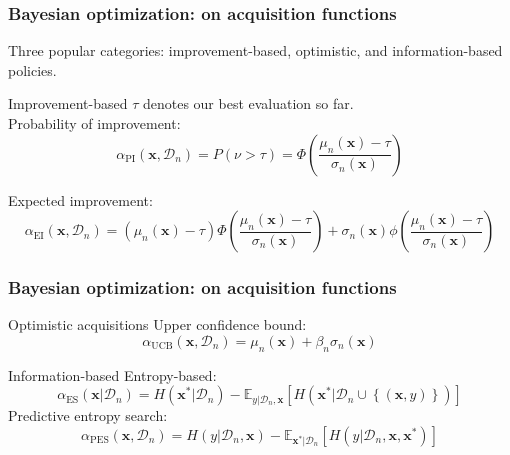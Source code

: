 \documentclass[10pt]{beamer}
\begin{document}
		\begin{frame}
			\frametitle{Bayesian optimization: on acquisition functions}
			Three popular categories: improvement-based, optimistic, and information-based policies.
			
			\begin{block}{Improvement-based}
				$\tau$ denotes our best evaluation so far.\\
				Probability of improvement:
				\begin{equation}
				\alpha_{\mathrm{PI}}(\boldsymbol{x}, \mathcal{D}_n) = P\left(\nu > \tau\right) = \Phi\left(\dfrac{\mu_n(\boldsymbol{x}) - \tau}{\sigma_n(\boldsymbol{x})}  \right)
				\end{equation}
				
				Expected improvement:
				\begin{equation}
				\alpha_{\mathrm{EI}}(\boldsymbol{x}, \mathcal{D}_n) = (\mu_n(\boldsymbol{x}) - \tau)\Phi\left(\dfrac{\mu_n(\boldsymbol{x}) - \tau}{\sigma_n(\boldsymbol{x})}  \right) + \sigma_n(\boldsymbol{x})\phi\left( \dfrac{\mu_n(\boldsymbol{x}) - \tau}{\sigma_n(\boldsymbol{x})} \right)
				\end{equation}
			\end{block}
		\end{frame}	
		
		\begin{frame}
			\frametitle{Bayesian optimization: on acquisition functions}
			\begin{block}{Optimistic acquisitions}
			Upper confidence bound:
			\begin{equation}
			\alpha_{\mathrm{UCB}}(\boldsymbol{x}, \mathcal{D}_n) = \mu_n(\boldsymbol{x}) + \beta_n\sigma_n(\boldsymbol{x})
			\end{equation}
			\end{block}
			
			\begin{block}{Information-based}
			Entropy-based:
			\begin{equation}
			\label{acqes}
			\alpha_{\mathrm{ES}}(\boldsymbol{x}|\mathcal{D}_n) = H(\boldsymbol{x}^*|\mathcal{D}_n) - \mathbb{E}_{y|\mathcal{D}_n, \boldsymbol{x}}\left[ H(\boldsymbol{x}^*|\mathcal{D}_n \cup \left\lbrace (\boldsymbol{x}, y) \right\rbrace) \right]
			\end{equation}
			Predictive entropy search:
			\begin{equation}
			\alpha_{\mathrm{PES}}(\boldsymbol{x}, \mathcal{D}_n) = H(y|\mathcal{D}_n, \boldsymbol{x}) - \mathbb{E}_{\boldsymbol{x}^*|\mathcal{D}_n}\left[ H(y |\mathcal{D}_n, \boldsymbol{x}, \boldsymbol{x}^*)  \right]
			\end{equation}

			\end{block}
		\end{frame}
		
\end{document}
